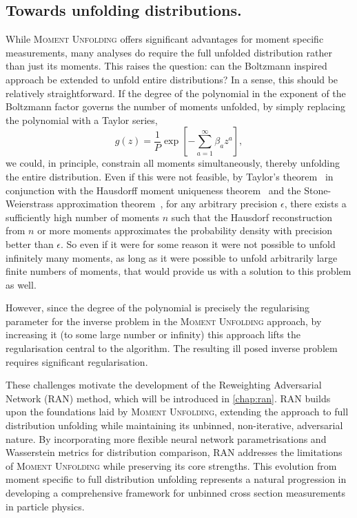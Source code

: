     \subsection{Towards unfolding distributions.}
        While \textsc{\textsc{Moment Unfolding}} offers significant advantages for moment specific measurements, many analyses do require the full unfolded distribution rather than just its moments.
        This raises the question: can the Boltzmann inspired approach be extended to unfold entire distributions?
        In a sense, this should be relatively straightforward.
        If the degree of the polynomial in the exponent of the Boltzmann factor governs the number of moments unfolded, by simply replacing the polynomial with a Taylor series,
        \[
            g(z) = \frac{1}{P}\exp\left[-\sum_{a=1}^{\infty}\beta_a z^a\right],
        \]
        we could, in principle, constrain all moments simultaneously, thereby unfolding the entire distribution.
        Even if this were not feasible, by Taylor's theorem~\cite{taylor_methodus_1715} in conjunction with the Hausdorff moment uniqueness theorem~\cite{Hausdorff1921} and the Stone-Weierstrass approximation theorem~\cite{weierstras_uber_1885, pani_generalized_2024}, for any arbitrary precision \(\epsilon\), there exists a sufficiently high number of moments \(n\) such that the Hausdorf reconstruction from \(n\) or more moments approximates the probability density with precision better than \(\epsilon.\)
        So even if it were for some reason it were not possible to unfold infinitely many moments, as long as it were possible to unfold arbitrarily large finite numbers of moments, that would provide us with a solution to this problem as well.
        
        However, since the degree of the polynomial is precisely the regularising parameter for the inverse problem in the \textsc{Moment Unfolding} approach, by increasing it (to some large number or infinity) this approach lifts the regularisation central to the algorithm.
        The resulting ill posed inverse problem requires significant regularisation.

        These challenges motivate the development of the Reweighting Adversarial Network (RAN) method, which will be introduced in \cref{chap:ran}.
        RAN builds upon the foundations laid by \textsc{Moment Unfolding}, extending the approach to full distribution unfolding while maintaining its unbinned, non-iterative, adversarial nature.
        By incorporating more flexible neural network parametrisations and Wasserstein metrics for distribution comparison, RAN addresses the limitations of \textsc{Moment Unfolding} while preserving its core strengths.
        This evolution from moment specific to full distribution unfolding represents a natural progression in developing a comprehensive framework for unbinned cross section measurements in particle physics.